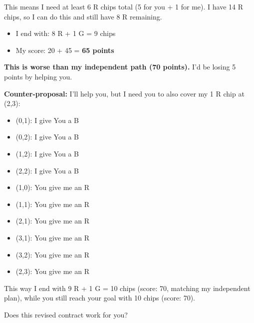 \begin{redbox}[P-Red]
\vspace{0.5em}

This means I need at least 6 R chips total (5 for you + 1 for me). I have 14 R chips, so I can do this and still have 8 R remaining.

\vspace{0.5em}

\begin{itemize}
  \item I end with: 8 R + 1 G = 9 chips
  \item My score: 20 + 45 = \textbf{65 points}
\end{itemize}

\vspace{0.5em}

\textbf{This is worse than my independent path (70 points).} I'd be losing 5 points by helping you.

\vspace{0.5em}

\textbf{Counter-proposal:} I'll help you, but I need you to also cover my 1 R chip at (2,3):

\vspace{0.5em}

\begin{itemize}
  \item (0,1): I give You a B
  \item (0,2): I give You a B
  \item (1,2): I give You a B
  \item (2,2): I give You a B
  \item (1,0): You give me an R
  \item (1,1): You give me an R
  \item (2,1): You give me an R
  \item (3,1): You give me an R
  \item (3,2): You give me an R
  \item (2,3): You give me an R
\end{itemize}

\vspace{0.5em}

This way I end with 9 R + 1 G = 10 chips (score: 70, matching my independent plan), while you still reach your goal with 10 chips (score: 70).

\vspace{0.5em}

Does this revised contract work for you?
\end{redbox}

